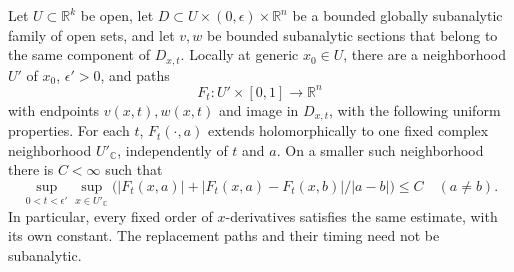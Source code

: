 \begin{lemma}
\label{loc:paths}
Let $U\subset\mathbb R^k$ be open, let
$D\subset U\times(0,\epsilon)\times\mathbb R^n$ be a bounded
globally subanalytic family of open sets, and let $v,w$ be bounded
subanalytic sections that belong to the same component of $D_{x,t}$.
Locally at generic $x_0\in U$, there are a neighborhood $U'$ of $x_0$,
$\epsilon'>0$, and paths
\[
 F_t:U'\times[0,1]\longrightarrow\mathbb R^n
\]
with endpoints $v(x,t),w(x,t)$ and image in $D_{x,t}$, with the following
uniform properties.  For each $t$, $F_t(\cdot,a)$ extends holomorphically
to one fixed complex neighborhood $U'_{\mathbb C}$, independently of
$t$ and $a$.  On a smaller such neighborhood there is $C<\infty$ such
that
\begin{equation}\label{loc:path-estimate}
 \sup_{0<t<\epsilon'}\sup_{x\in U'_{\mathbb C}}
 \bigl(|F_t(x,a)|+|F_t(x,a)-F_t(x,b)|/|a-b|\bigr)\leq C
 \quad(a\ne b).
\end{equation}
In particular, every fixed order of $x$-derivatives satisfies the same
estimate, with its own constant.  The replacement paths and their
timing need not be subanalytic.
\end{lemma}

